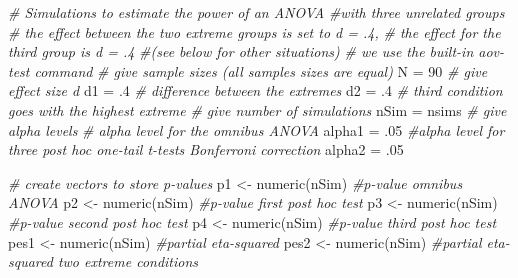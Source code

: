 \documentclass[
]{book}
\newenvironment{Shaded}{\begin{snugshade}}{\end{snugshade}}
\newcommand{\CommentTok}[1]{\textcolor[rgb]{0.56,0.35,0.01}{\textit{#1}}}
\newcommand{\DecValTok}[1]{\textcolor[rgb]{0.00,0.00,0.81}{#1}}
\newcommand{\FunctionTok}[1]{\textcolor[rgb]{0.00,0.00,0.00}{#1}}
\newcommand{\NormalTok}[1]{#1}
\newcommand{\OtherTok}[1]{\textcolor[rgb]{0.56,0.35,0.01}{#1}}
\begin{document}
\begin{Shaded}
\begin{Highlighting}[]
\CommentTok{\# Simulations to estimate the power of an ANOVA }
\CommentTok{\#with three unrelated groups}
\CommentTok{\# the effect between the two extreme groups is set to d = .4, }
\CommentTok{\# the effect for the third group is d = .4 }
\CommentTok{\#(see below for other situations)}
\CommentTok{\# we use the built{-}in aov{-}test command}
\CommentTok{\# give sample sizes (all samples sizes are equal)}
\NormalTok{N }\OtherTok{=} \DecValTok{90}
\CommentTok{\# give effect size d}
\NormalTok{d1 }\OtherTok{=}\NormalTok{ .}\DecValTok{4} \CommentTok{\# difference between the extremes}
\NormalTok{d2 }\OtherTok{=}\NormalTok{ .}\DecValTok{4} \CommentTok{\# third condition goes with the highest extreme}
\CommentTok{\# give number of simulations}
\NormalTok{nSim }\OtherTok{=}\NormalTok{ nsims}
\CommentTok{\# give alpha levels}
\CommentTok{\# alpha level for the omnibus ANOVA}
\NormalTok{alpha1 }\OtherTok{=}\NormalTok{ .}\DecValTok{05} 
\CommentTok{\#alpha level for three post hoc one{-}tail t{-}tests Bonferroni correction}
\NormalTok{alpha2 }\OtherTok{=}\NormalTok{ .}\DecValTok{05} 
\end{Highlighting}
\end{Shaded}

\begin{Shaded}
\begin{Highlighting}[]
\CommentTok{\# create vectors to store p{-}values}
\NormalTok{p1 }\OtherTok{\textless{}{-}} \FunctionTok{numeric}\NormalTok{(nSim) }\CommentTok{\#p{-}value omnibus ANOVA}
\NormalTok{p2 }\OtherTok{\textless{}{-}} \FunctionTok{numeric}\NormalTok{(nSim) }\CommentTok{\#p{-}value first post hoc test}
\NormalTok{p3 }\OtherTok{\textless{}{-}} \FunctionTok{numeric}\NormalTok{(nSim) }\CommentTok{\#p{-}value second post hoc test}
\NormalTok{p4 }\OtherTok{\textless{}{-}} \FunctionTok{numeric}\NormalTok{(nSim) }\CommentTok{\#p{-}value third post hoc test}
\NormalTok{pes1 }\OtherTok{\textless{}{-}} \FunctionTok{numeric}\NormalTok{(nSim) }\CommentTok{\#partial eta{-}squared}
\NormalTok{pes2 }\OtherTok{\textless{}{-}} \FunctionTok{numeric}\NormalTok{(nSim) }\CommentTok{\#partial eta{-}squared two extreme conditions}
\end{Highlighting}
\end{Shaded}
\end{document}
